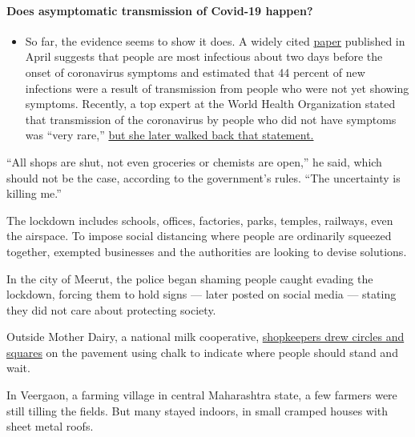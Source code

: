\begin{itemize}
{  \paragraph{Does asymptomatic transmission of Covid-19
  happen?}\label{does-asymptomatic-transmission-of-covid-19-happen}}

  \begin{itemize}
  \tightlist
  \item
    So far, the evidence seems to show it does. A widely cited
    \href{https://www.nature.com/articles/s41591-020-0869-5}{paper}
    published in April suggests that people are most infectious about
    two days before the onset of coronavirus symptoms and estimated that
    44 percent of new infections were a result of transmission from
    people who were not yet showing symptoms. Recently, a top expert at
    the World Health Organization stated that transmission of the
    coronavirus by people who did not have symptoms was ``very rare,''
    \href{https://www.nytimes.com/2020/06/09/world/coronavirus-updates.html?action=click\&pgtype=Article\&state=default\&region=MAIN_CONTENT_3\&context=storylines_faq\#link-1f302e21}{but
    she later walked back that statement.}
  \end{itemize}
\end{itemize}

``All shops are shut, not even groceries or chemists are open,'' he
said, which should not be the case, according to the government's rules.
``The uncertainty is killing me.''

The lockdown includes schools, offices, factories, parks, temples,
railways, even the airspace. To impose social distancing where people
are ordinarily squeezed together, exempted businesses and the
authorities are looking to devise solutions.

In the city of Meerut, the police began shaming people caught evading
the lockdown, forcing them to hold signs --- later posted on social
media --- stating they did not care about protecting society.

Outside Mother Dairy, a national milk cooperative,
\href{https://twitter.com/MotherDairyMilk/status/1242679065825488896}{shopkeepers
drew circles and squares} on the pavement using chalk to indicate where
people should stand and wait.

In Veergaon, a farming village in central Maharashtra state, a few
farmers were still tilling the fields. But many stayed indoors, in small
cramped houses with sheet metal roofs.

